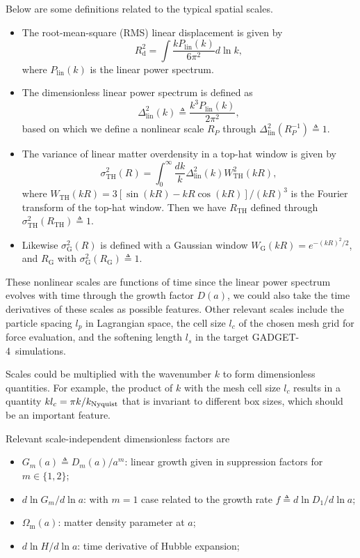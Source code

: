 \documentclass[modern, trackchanges, dvipsnames]{aastex631}
\newcommand{\GADGET}{{{\fontsize{10pt}{12pt}\selectfont GADGET}-4}}
\renewcommand{\d}{d}
\newcommand{\lna}{\ln\!a}
\newcommand{\lnk}{\ln\!k}
\newcommand{\Omegam}{\Omega_\mathrm{m}}
\newcommand{\linear}{\mathrm{lin}}
\newcommand{\tophat}{\mathrm{TH}}
\newcommand{\gauss}{\mathrm{G}}
\begin{document}
Below are some definitions related to the typical spatial scales.
\begin{itemize}
\item The root-mean-square (RMS) linear displacement is given by
%
\begin{equation}
R_\mathrm{d}^2 = \int \frac{k P_\linear(k)}{6\pi^2} \d\lnk,
\end{equation}
%
where $P_\linear(k)$ is the linear power spectrum.
\item The dimensionless linear power spectrum is defined as
%
\begin{equation}
\Delta^2_\linear(k) \triangleq \frac{k^3 P_\linear(k)}{2 \pi^2},
\end{equation}
%
based on which we define a nonlinear scale $R_P$ through
$\Delta_\linear^2(R_P^{-1}) \triangleq 1$.
\item The variance of linear matter overdensity in a top-hat window is given by
%
\begin{equation}
\sigma_\tophat^2(R) = \int_0^\infty \frac{\d k}k
  \Delta_\linear^2(k) W_\tophat^2(kR),
\end{equation}
%
where $W_\tophat(kR) = 3[\sin(kR) - kR\cos(kR)] / (kR)^3$ is the
Fourier transform of the top-hat window.
Then we have $R_\tophat$ defined through $\sigma_\tophat^2(R_\tophat)
\triangleq 1$.
\item Likewise $\sigma_\gauss^2(R)$ is defined with a Gaussian window
$W_\gauss(kR) = e^{-(kR)^2/2}$, and $R_\gauss$ with
$\sigma_\gauss^2(R_\gauss) \triangleq 1$.
\end{itemize}
These nonlinear scales are functions of time since the linear power
spectrum evolves with time through the growth factor $D(a)$, we could
also take the time derivatives of these scales as possible features.
Other relevant scales include the particle spacing $l_p$ in Lagrangian
space, the cell size $l_c$ of the chosen mesh grid for force evaluation,
and the softening length $l_s$ in the target \GADGET\ simulations.

Scales could be multiplied with the wavenumber $k$ to form dimensionless
quantities.
For example, the product of $k$ with the mesh cell size $l_c$ results in
a quantity $kl_c = \pi k/k_{\rm Nyquist}$ that is invariant to different
box sizes, which should be an important feature.

Relevant scale-independent dimensionless factors are
\begin{itemize}
\item $G_m(a) \triangleq D_m(a) / a^m$: linear growth given in
  suppression factors for $m \in \{1, 2\}$;
\item $\d\ln G_m / \d\lna$: with $m=1$ case related to the growth rate
  $f \triangleq \d\ln D_1 / \d\lna$;
\item $\Omegam(a)$: matter density parameter at $a$;
\item $\d\ln\!H / \d\lna$: time derivative of Hubble expansion;
\end{itemize}
\end{document}
